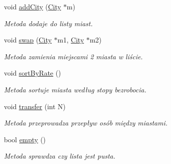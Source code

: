 \begin{DoxyCompactItemize}
void \mbox{\hyperlink{struct_city_list_a6da84a7b2fadd94a3f361171beca61fd}{add\+City}} (\mbox{\hyperlink{struct_city}{City}} $\ast$m)
\begin{DoxyCompactList}\small\item\em Metoda dodaje do listy miast. \end{DoxyCompactList}\item 
void \mbox{\hyperlink{struct_city_list_a5d49c5c9885de03e75922be3936b4209}{swap}} (\mbox{\hyperlink{struct_city}{City}} $\ast$m1, \mbox{\hyperlink{struct_city}{City}} $\ast$m2)
\begin{DoxyCompactList}\small\item\em Metoda zamienia miejscami 2 miasta w liście. \end{DoxyCompactList}\item 
void \mbox{\hyperlink{struct_city_list_a8d50de940f0f195ee7881fb6bed3e535}{sort\+By\+Rate}} ()
\begin{DoxyCompactList}\small\item\em Metoda sortuje miasta według stopy bezrobocia. \end{DoxyCompactList}\item 
void \mbox{\hyperlink{struct_city_list_a24e6389b175a63e25640ede4aed88021}{transfer}} (int N)
\begin{DoxyCompactList}\small\item\em Metoda przeprowadza przepływ osób między miastami. \end{DoxyCompactList}\item 
bool \mbox{\hyperlink{struct_city_list_ac6bb86bf8511ba6bfc124f0c905cb08b}{empty}} ()
\begin{DoxyCompactList}\small\item\em Metoda sprawdza czy lista jest pusta. \end{DoxyCompactList}\end{DoxyCompactItemize}
